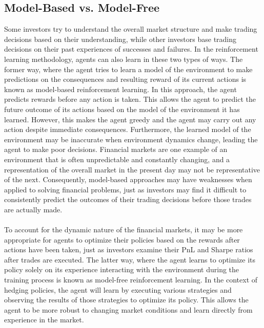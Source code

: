 \subsection{Model-Based vs. Model-Free}
Some investors try to understand the overall market structure and make trading decisions based on their understanding, while other investors base trading decisions on their past experiences of successes and failures. In the reinforcement learning methodology, agents can also learn in these two types of ways. The former way, where the agent tries to learn a model of the environment to make predictions on the consequences and resulting reward of its current actions is known as model-based reinforcement learning. In this approach, the agent predicts rewards before any action is taken. This allows the agent to predict the future outcome of its actions based on the model of the environment it has learned. However, this makes the agent greedy and the agent may carry out any action despite immediate consequences. Furthermore, the learned model of the environment may be inaccurate when environment dynamics change, leading the agent to make poor decisions. Financial markets are one example of an environment that is often unpredictable and constantly changing, and a representation of the overall market in the present day may not be representative of the next. Consequently, model-based approaches may have weaknesses when applied to solving financial problems, just as investors may find it difficult to consistently predict the outcomes of their trading decisions before those trades are actually made.
\\ \\
To account for the dynamic nature of the financial markets, it may be more appropriate for agents to optimize their policies based on the rewards after actions have been taken, just as investors examine their PnL and Sharpe ratios after trades are executed. The latter way, where the agent learns to optimize its policy solely on its experience interacting with the environment during the training process is known as model-free reinforcement learning. In the context of hedging policies, the agent will learn by executing various strategies and observing the results of those strategies to optimize its policy. This allows the agent to be more robust to changing market conditions and learn directly from experience in the market.

